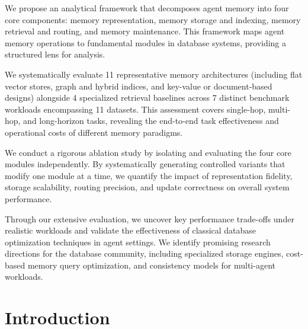 \noindent {} We propose an analytical framework that decomposes agent memory into four core components: memory representation, memory storage and indexing, memory retrieval and routing, and memory maintenance. This framework maps agent memory operations to fundamental modules in database systems, providing a structured lens for analysis.


\noindent {} We systematically evaluate 11 representative memory architectures (including flat vector stores, graph and hybrid indices, and key-value or document-based designs) alongside 4 specialized retrieval baselines across 7 distinct benchmark workloads encompassing 11 datasets. This assessment covers single-hop, multi-hop, and long-horizon tasks, revealing the end-to-end task effectiveness and operational costs of different memory paradigms.

\noindent {} We conduct a rigorous ablation study by isolating and evaluating the four core modules independently. By systematically generating controlled variants that modify one module at a time, we quantify the impact of representation fidelity, storage scalability, routing precision, and update correctness on overall system performance.

\noindent {} Through our extensive evaluation, we uncover key performance trade-offs under realistic workloads and validate the effectiveness of classical database optimization techniques in agent settings. We identify promising research directions for the database community, including specialized storage engines, cost-based memory query optimization, and consistency models for multi-agent workloads.
\fi








\iffalse
\section{Introduction}
\label{sec:intro}



